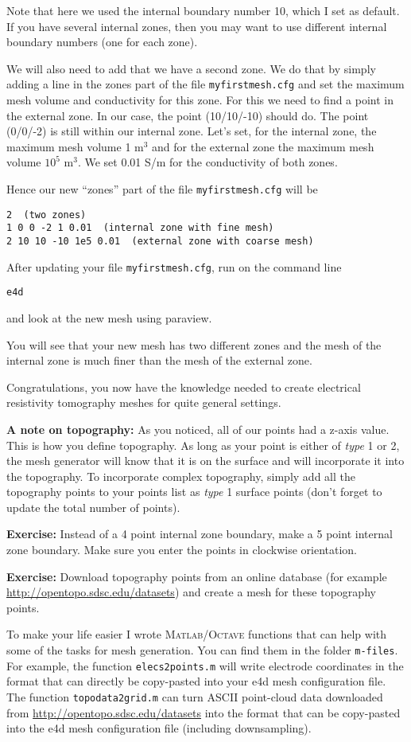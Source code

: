 \documentclass[11pt]{article}
\begin{document}
Note that here we used the internal boundary number 10, which I set as
default. If you have several internal zones, then you may want to use
different internal boundary numbers (one for each zone).


We will also need to add that we have a second zone. We do that by
simply adding a line in the zones part of the file
\verb+myfirstmesh.cfg+ and set the maximum mesh volume and
conductivity for this zone. For this we need to find a point in the
external zone. In our case, the point (10/10/-10) should do. The point
(0/0/-2) is still within our internal zone. Let's set, for the
internal zone, the maximum mesh volume 1 m$^3$ and for the external zone
the maximum mesh volume $10^5$ m$^3$. We set 0.01 S/m for the
conductivity of both zones.

Hence our new ``zones'' part of the file \verb+myfirstmesh.cfg+ will
be

\verb+2  (two zones)+\\
\verb+1 0 0 -2 1 0.01  (internal zone with fine mesh)+\\
\verb+2 10 10 -10 1e5 0.01  (external zone with coarse mesh)+


After updating your file \verb+myfirstmesh.cfg+, run on the command
line

\qquad \verb+e4d+

and look at the new mesh using paraview.

You will see that your new mesh has two different zones and the mesh
of the internal zone is much finer than the mesh of the external zone.


Congratulations, you now have the knowledge needed to create
electrical resistivity tomography meshes for quite general settings.

\textbf{A note on topography:} As you noticed, all of our points had a
z-axis value. This is how you define topography. As long as your point
is either of \emph{type} 1 or 2, the mesh generator will know that it
is on the surface and will incorporate it into the topography. To
incorporate complex topography, simply add all the topography points
to your points list as \emph{type} 1 surface points (don't forget to
update the total number of points).

\textbf{Exercise:} Instead of a 4 point internal zone boundary, make a
5 point internal zone boundary. Make sure you enter the points in
clockwise orientation.

\textbf{Exercise:} Download topography points from an online database
(for example \url{http://opentopo.sdsc.edu/datasets}) and create a
mesh for these topography points.

To make your life easier I wrote \textsc{Matlab}/\textsc{Octave}
functions that can help with some of the tasks for mesh
generation. You can find them in the folder \verb+m-files+. For
example, the function \verb+elecs2points.m+ will write electrode
coordinates in the format that can directly be copy-pasted into your
e4d mesh configuration file. The function \verb+topodata2grid.m+ can
turn ASCII point-cloud data downloaded from
\url{http://opentopo.sdsc.edu/datasets} into the format that can be
copy-pasted into the e4d mesh configuration file (including
downsampling).
\end{document}
